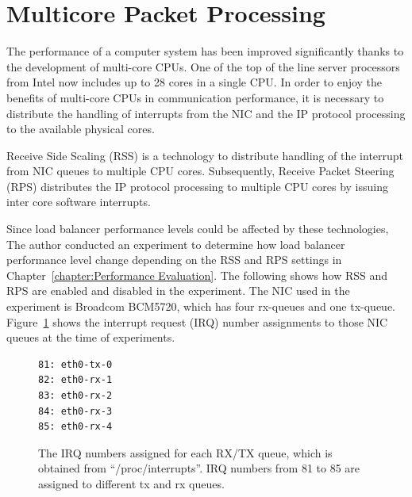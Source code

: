 \FloatBarrier

\section{Multicore Packet Processing}

The performance of a computer system has been improved significantly thanks to the development of multi-core CPUs.
One of the top of the line server processors from Intel now includes up to 28 cores in a single CPU.
In order to enjoy the benefits of multi-core CPUs in communication performance,
it is necessary to distribute the handling of interrupts from the NIC and the IP protocol processing to the available physical cores.

Receive Side Scaling (RSS) \cite{TomHerbert} is a technology 
to distribute handling of the interrupt from NIC queues to multiple CPU cores.
Subsequently, Receive Packet Steering (RPS) \cite{TomHerbert} distributes the IP protocol processing 
to multiple CPU cores by issuing inter core software interrupts.

Since load balancer performance levels could be affected by these technologies,
The author conducted an experiment to determine how load balancer performance level change depending on the RSS and RPS settings in Chapter~\ref{chapter:Performance Evaluation}.
The following shows how RSS and RPS are enabled and disabled in the experiment. 
The NIC used in the experiment is Broadcom BCM5720, which has four rx-queues and one tx-queue.
Figure~\ref{fig:rx-queue} shows the interrupt request (IRQ) number assignments to those NIC queues at the time of experiments.

\begin{figure}[h]
\centering
\begin{minipage}{0.3\columnwidth}
\begin{verbatim}
81: eth0-tx-0
82: eth0-rx-1
83: eth0-rx-2
84: eth0-rx-3
85: eth0-rx-4
\end{verbatim}
\end{minipage}

\par\bigskip
\centering
\begin{minipage}{0.9\columnwidth}
  \caption[The IRQ numbers assigned for each RX/TX queue]{
    The IRQ numbers assigned for each RX/TX queue, which is obtained from \enquote{/proc/interrupts}.
    IRQ numbers from 81 to 85 are assigned to different tx and rx queues.
  }
  \label{fig:rx-queue}
\end{minipage}

\end{figure}

